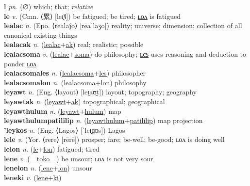 \textbf{l} \textit{pn.} (∅)
which; that; \textit{relative} \label{l} \\
\textbf{le} \textit{v.} (Cmn. ⟨累⟩ [leɪ̯˥˩])
be fatigued; be tired; \hyperref[lelon]{ʟᴏᴧ} is fatigued \label{le} \\
\textbf{lealac} \textit{n.} (Epo. ⟨realaĵo⟩ [reaˈlaʒo])
reality; universe; dimension; collection of all canonical existing things \label{lealac} \\
\textbf{lealacak} \textit{n.} (\hyperref[lealac]{lealac}+\hyperref[ak]{ak})
real; realistic; possible \label{lealacak} \\
\textbf{lealacsoma} \textit{v.} (\hyperref[lealac]{lealac}+\hyperref[soma]{soma})
do philosophy; \hyperref[lealacsomales]{ʟєꜱ} uses reasoning and deduction to ponder \hyperref[lealacsomalon]{ʟᴏᴧ} \label{lealacsoma} \\
\textbf{lealacsomales} \textit{n.} (\hyperref[lealacsoma]{lealacsoma}+\hyperref[les]{les})
philosopher \label{lealacsomales} \\
\textbf{lealacsomalon} \textit{n.} (\hyperref[lealacsoma]{lealacsoma}+\hyperref[lon]{lon})
philosophy \label{lealacsomalon} \\
\textbf{leyawt} \textit{n.} (Eng. ⟨layout⟩ [leɪ̯aʊ̯t])
layout; topography; geography \label{leyawt} \\
\textbf{leyawtak} \textit{n.} (\hyperref[leyawt]{leyawt}+\hyperref[ak]{ak})
topographical; geographical \label{leyawtak} \\
\textbf{leyawthulum} \textit{n.} (\hyperref[leyawt]{leyawt}+\hyperref[hulum]{hulum})
map \label{leyawthulum} \\
\textbf{leyawthulumpatililip} \textit{n.} (\hyperref[leyawthulum]{leyawthulum}+\hyperref[patililip]{patililip})
map projection \label{leyawthulumpatililip} \\
\textbf{'leykos} \textit{n.} (Eng. ⟨Lagos⟩ [ˈleɪ̯ɡɒs])
Lagos \label{'leykos} \\
\textbf{lele} \textit{v.} (Yor. ⟨rere⟩ [rērē])
prosper; fare; be-well; be-good; ʟᴏᴧ is doing well \label{lele} \\
\textbf{lelon} \textit{n.} (\hyperref[le]{le}+\hyperref[lon]{lon})
fatigued; tired \label{lelon} \\
\textbf{lene} \textit{v.} (\hyperref[toko]{~~toko~~})
be unsour; \hyperref[lenelon]{ʟᴏᴧ} is not very sour \label{lene} \\
\textbf{lenelon} \textit{n.} (\hyperref[lene]{lene}+\hyperref[lon]{lon})
unsour \label{lenelon} \\
\textbf{leneki} \textit{v.} (\hyperref[lene]{lene}+\hyperref[ki]{ki})
